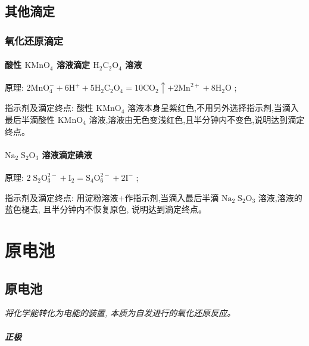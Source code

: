 \documentclass[10pt,cn]{elegantbook}
\begin{document}
\section{其他滴定}

\subsection{氧化还原滴定}

\subsubsection{酸性 \({\mathrm{{KMnO}}}_{4}\) 溶液滴定 \({\mathrm{H}}_{2}{\mathrm{C}}_{2}{\mathrm{O}}_{4}\) 溶液}

原理: \(2{\mathrm{{MnO}}}_{4}^{ - } + 6{\mathrm{H}}^{ + } + 5{\mathrm{H}}_{2}{\mathrm{C}}_{2}{\mathrm{O}}_{4} = {10}{\mathrm{{CO}}}_{2} \uparrow + 2{\mathrm{{Mn}}}^{2 + } + 8{\mathrm{H}}_{2}\mathrm{O}\) ;

指示剂及滴定终点: 酸性 \({\mathrm{{KMnO}}}_{4}\) 溶液本身呈紫红色,不用另外选择指示剂,当滴入最后半滴酸性 \({\mathrm{{KMnO}}}_{4}\) 溶液,溶液由无色变浅红色,且半分钟内不变色,说明达到滴定终点。

\subsubsection{ \({\mathrm{{Na}}}_{2}{\mathrm{\;S}}_{2}{\mathrm{O}}_{3}\) 溶液滴定碘液}

原理: \(2{\mathrm{\;S}}_{2}{\mathrm{O}}_{3}^{2 - } + {\mathrm{I}}_{2} = {\mathrm{S}}_{4}{\mathrm{O}}_{6}^{2 - } + 2{\mathrm{I}}^{ - }\) ;

指示剂及滴定终点: 用淀粉溶液+作指示剂,当滴入最后半滴 \({\mathrm{{Na}}}_{2}{\mathrm{\;S}}_{2}{\mathrm{O}}_{3}\) 溶液,溶液的蓝色褪去, 且半分钟内不恢复原色, 说明达到滴定终点。


\chapter{原电池}

\section{原电池}

\textit{将化学能转化为电能的装置, 本质为自发进行的氧化还原反应。}

\paragraph*{正极}
\end{document}
